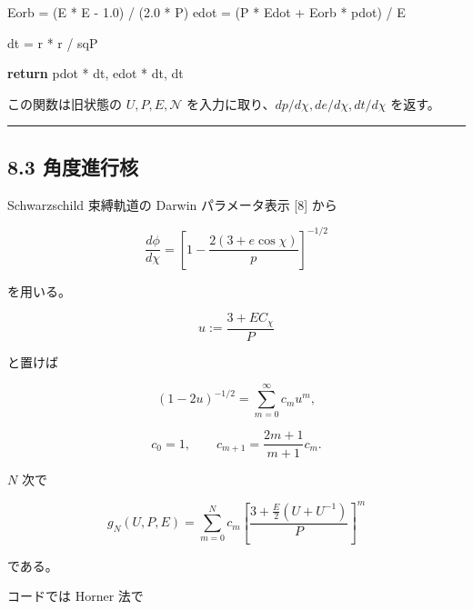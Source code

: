 \documentclass[
  a4paper,
]{ltjsarticle}
\newenvironment{Shaded}{}{}
\newcommand{\ControlFlowTok}[1]{\textcolor[rgb]{0.00,0.44,0.13}{\textbf{#1}}}
\newcommand{\FloatTok}[1]{\textcolor[rgb]{0.25,0.63,0.44}{#1}}
\newcommand{\NormalTok}[1]{#1}
\newcommand{\OperatorTok}[1]{\textcolor[rgb]{0.40,0.40,0.40}{#1}}
\begin{document}
\begin{Shaded}
\begin{Highlighting}[]
\NormalTok{    Eorb }\OperatorTok{=}\NormalTok{ (E }\OperatorTok{*}\NormalTok{ E }\OperatorTok{{-}} \FloatTok{1.0}\NormalTok{) }\OperatorTok{/}\NormalTok{ (}\FloatTok{2.0} \OperatorTok{*}\NormalTok{ P)}
\NormalTok{    edot }\OperatorTok{=}\NormalTok{ (P }\OperatorTok{*}\NormalTok{ Edot }\OperatorTok{+}\NormalTok{ Eorb }\OperatorTok{*}\NormalTok{ pdot) }\OperatorTok{/}\NormalTok{ E}

\NormalTok{    dt }\OperatorTok{=}\NormalTok{ r }\OperatorTok{*}\NormalTok{ r }\OperatorTok{/}\NormalTok{ sqP}

    \ControlFlowTok{return}\NormalTok{ pdot }\OperatorTok{*}\NormalTok{ dt, edot }\OperatorTok{*}\NormalTok{ dt, dt}
\end{Highlighting}
\end{Shaded}

この関数は旧状態の \(U,P,E,\mathcal N\)
を入力に取り、\(dp/d\chi,de/d\chi,dt/d\chi\) を返す。

\begin{center}\rule{0.5\linewidth}{0.5pt}\end{center}

\subsection{8.3 角度進行核}\label{ux89d2ux5ea6ux9032ux884cux6838}

Schwarzschild 束縛軌道の Darwin パラメータ表示 {[}8{]} から

\[
\frac{d\phi}{d\chi}
=
\left[
1-\frac{2(3+e\cos\chi)}p
\right]^{-1/2}
\]

を用いる。

\[
u
:=
\frac{3+EC_\chi}{P}
\]

と置けば

\[
(1-2u)^{-1/2}
=
\sum_{m=0}^{\infty}c_mu^m,
\]

\[
c_0=1,
\qquad
c_{m+1}=\frac{2m+1}{m+1}c_m.
\]

\(N\) 次で

\[
\boxed{
g_N(U,P,E)
=\sum_{m=0}^{N}c_m
\left[
\frac{3+\frac E2(U+U^{-1})}{P}
\right]^m
}
\]

である。

コードでは Horner 法で
\end{document}
